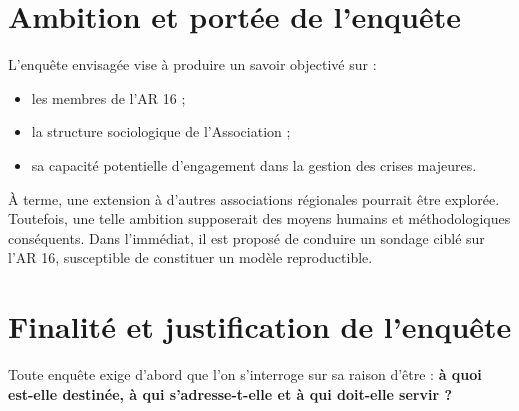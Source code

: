 \documentclass[12pt,a4paper]{article}
\begin{document}

\clearpage
{}
\tableofcontents
\clearpage
{}

\section{Ambition et portée de l'enquête}

L'enquête envisagée vise à produire un savoir objectivé sur :

\begin{itemize}
    \item les membres de l'AR 16 ;
    \item la structure sociologique de l'Association ;
    \item sa capacité potentielle d'engagement dans la gestion des crises majeures.
\end{itemize}

À terme, une extension à d'autres associations régionales pourrait être explorée.
Toutefois, une telle ambition supposerait des moyens humains et méthodologiques conséquents.
Dans l'immédiat, il est proposé de conduire un sondage ciblé sur l'AR 16, susceptible de constituer un modèle reproductible.

\section{Finalité et justification de l'enquête}

Toute enquête exige d'abord que l'on s'interroge sur sa raison d'être :
\textbf{à quoi est-elle destinée, à qui s'adresse-t-elle et à qui doit-elle servir ?}
\end{document}
